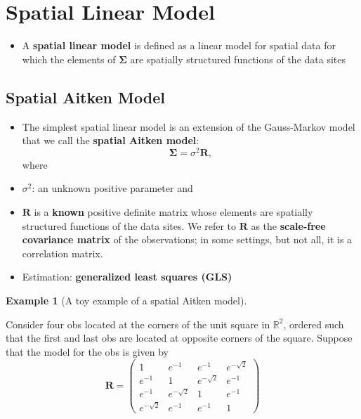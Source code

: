 \documentclass[
  letterpaper,
  DIV=11,
  numbers=noendperiod]{scrreprt}
\providecommand{\tightlist}{%
  \setlength{\itemsep}{0pt}\setlength{\parskip}{0pt}}\usepackage{longtable,booktabs,array}
\theoremstyle{definition}
\theoremstyle{plain}
\theoremstyle{definition}
\newtheorem{example}{Example}[chapter]
\theoremstyle{definition}
\theoremstyle{remark}
\begin{document}
\section{Spatial Linear Model}\label{spatial-linear-model}

\begin{itemize}
\tightlist
\item
  A \textbf{spatial linear model} is defined as a linear model for
  spatial data for which the elements of \(\pmb{\Sigma}\) are spatially
  structured functions of the data sites
\end{itemize}

\subsection{Spatial Aitken Model}\label{spatial-aitken-model}

\begin{itemize}
\item
  The simplest spatial linear model is an extension of the Gauss-Markov
  model that we call the \textbf{spatial Aitken model}: \[
  \pmb{\Sigma} = \sigma^2 \pmb{R},
  \] where
\item
  \(\sigma^2\): an unknown positive parameter and
\item
  \(\pmb{R}\) is a \textbf{known} positive definite matrix whose
  elements are spatially structured functions of the data sites. We
  refer to \(\pmb{R}\) as the \textbf{scale-free covariance matrix} of
  the observations; in some settings, but not all, it is a correlation
  matrix.
\item
  Estimation: \textbf{generalized least squares (GLS)}
\end{itemize}

\begin{example}[A toy example of a spatial Aitken
model]\protect\hypertarget{exm-Aitken}{}\label{exm-Aitken}

Consider four obs located at the corners of the unit square in
\(\mathbb{R}^2\), ordered such that the first and last obs are located
at opposite corners of the square. Suppose that the model for the obs is
given by \[
\pmb{R} = 
\begin{pmatrix}
1 & e^{-1} & e^{-1} & e^{-\sqrt{2}}\\
e^{-1} & 1 & e^{-\sqrt{2}} & e^{-1}\\
e^{-1} & e^{-\sqrt{2}} & 1 & e^{-1}\\
e^{-\sqrt{2}} & e^{-1} & e^{-1} & 1
\end{pmatrix}
\]

\end{example}
\end{document}
